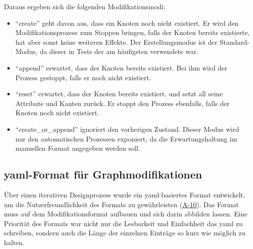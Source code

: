 Daraus ergeben sich die folgenden Modifikationsmodi:

\begin{itemize}
    \itemsep0em
    \item \enquote{create} geht davon aus, dass ein Knoten noch nicht existiert.
    Er wird den Modifikationsprozess zum Stoppen bringen, falls der Knoten bereits existierte, hat aber sonst keine weiteren Effekte.
    Der Erstellungsmodus ist der Standard-Modus, da dieser in Tests der am häufigsten verwendete war.
    \item \enquote{append} erwartet, dass der Knoten bereits existiert.
    Bei ihm wird der Prozess gestoppt, falls er noch nicht existiert.
    \item \enquote{reset} erwartet, dass der Knoten bereits existiert, und setzt all seine Attribute und Kanten zurück.
    Er stoppt den Prozess ebenfalls, falls der Knoten noch nicht existiert.
    \item \enquote{create\_or\_append} ignoriert den vorherigen Zustand.
    Dieser Modus wird nur den automatischen Prozessen exponiert, da die Erwartungshaltung im manuellen Format angegeben werden soll.
\end{itemize}

\subsection{\acrshort{yaml}-Format für Graphmodifikationen}\label{subsec:modell-graph-modification-yaml}

Über einen iterativen Designprozess wurde ein \acrshort{yaml}-basiertes Format entwickelt, um die Nutzerfreundlichkeit des Formats zu gewährleisten (\hyperref[subsec:req-manual-format-modification]{A-10}).
Das Format muss auf dem Modifikationsformat aufbauen und sich darin abbilden lassen.
Eine Priorität des Formats war nicht nur die Lesbarkeit und Einfachheit das \acrshort{yaml} zu schreiben, sondern auch die Länge der einzelnen Einträge so kurz wie möglich zu halten.

